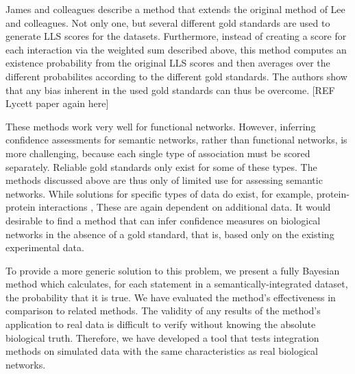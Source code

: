 \documentclass{bioinfo}
\newcommand{\note}[1]{{\color{red}[#1]}}
\begin{document}
James and colleagues describe a method that extends the original method of Lee and colleagues. Not only one, but several different gold standards are used to generate LLS scores for the datasets. Furthermore, instead of creating a score for each interaction via the weighted sum described above, this method computes an existence probability from the original LLS scores and then averages over the different probabilites according to the different gold standards. The authors show that any bias inherent in the used gold standards can thus be overcome. \note{REF Lycett paper again here}

These methods work very well for functional networks. However, inferring confidence assessments for semantic networks, rather than functional networks, is more challenging, because each single type of association must be scored separately. Reliable gold standards only exist for some of these types. The methods discussed above are thus only of limited use for assessing semantic networks. While solutions for specific types of data do exist, for example, protein-protein interactions \citep{troyanskaya_bayesian_2003,bader_gaining_2004,braun_experimentally_2009,venkatesan_empirical_2009}, These are again dependent on additional data. It would desirable to find a method that can infer confidence measures on biological networks in the absence of a gold standard, that is, based only on the existing experimental data. 

To provide a more generic solution to this problem, we present a fully Bayesian method which calculates, for each statement in a semantically-integrated dataset, the probability that it is true. We have evaluated the method's effectiveness in comparison to related methods. The validity of any results of the method's application to real data is difficult to verify without knowing the absolute biological truth. Therefore, we have developed a tool that tests integration methods on simulated data with the same characteristics as real biological networks.
\end{document}
